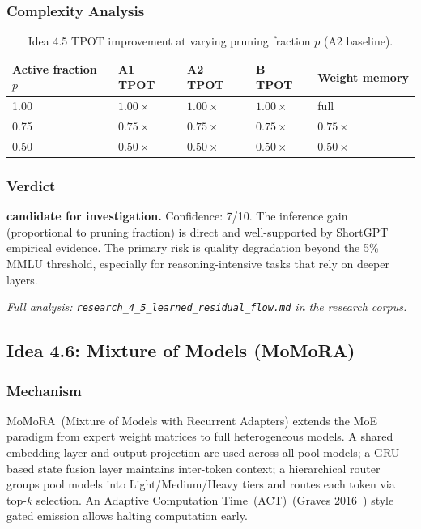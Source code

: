 \documentclass[11pt]{article}
\begin{document}
\subsubsection*{Complexity Analysis}

\begin{table}[h]
\centering
\caption{Idea 4.5 TPOT improvement at varying pruning fraction $p$ (A2 baseline).}
\small
\begin{tabular}{lllll}
\toprule
Active fraction $p$ & A1 TPOT & A2 TPOT & B TPOT & Weight memory \\
\midrule
1.00 & $1.00\times$ & $1.00\times$ & $1.00\times$ & full \\
0.75 & $0.75\times$ & $0.75\times$ & $0.75\times$ & $0.75\times$ \\
0.50 & $0.50\times$ & $0.50\times$ & $0.50\times$ & $0.50\times$ \\
\bottomrule
\end{tabular}
\end{table}

\subsubsection*{Verdict}

\noindent\textbf{candidate for investigation.} Confidence: 7/10. The inference gain (proportional to pruning fraction) is direct and well-supported by ShortGPT empirical evidence. The primary risk is quality degradation beyond the 5\% MMLU threshold, especially for reasoning-intensive tasks that rely on deeper layers.

\par\noindent\textit{Full analysis: \texttt{research\_4\_5\_learned\_residual\_flow.md} in the research corpus.}


\subsection{Idea 4.6: Mixture of Models (MoMoRA)}
\label{subsec:idea46}

\subsubsection*{Mechanism}

MoMoRA~(Mixture of Models with Recurrent Adapters) extends the MoE paradigm from expert weight matrices to full heterogeneous models. A shared embedding layer and output projection are used across all pool models; a GRU-based state fusion layer maintains inter-token context; a hierarchical router groups pool models into Light/Medium/Heavy tiers and routes each token via top-$k$ selection. An Adaptive Computation Time~(ACT)~(Graves 2016~\cite{GravesACT2016}) style gated emission allows halting computation early.
\end{document}
